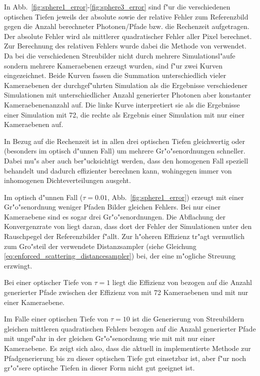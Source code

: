 	
	In Abb.~\ref{fig:sphere1_error}-\ref{fig:sphere3_error} sind f"ur die verschiedenen optischen Tiefen jeweils der absolute sowie der relative Fehler zum Referenzbild gegen die Anzahl berechneter Photonen/Pfade bzw. die Rechenzeit aufgetragen. Der absolute Fehler wird als mittlerer quadratischer Fehler aller Pixel berechnet. Zur Berechnung des relativen Fehlers wurde dabei die Methode von \citet{Pryce:1984p13059} verwendet. Da bei \mctd die verschiedenen Streubilder nicht durch mehrere Simulationsl"aufe sondern mehrere Kameraebenen erzeugt wurden, sind f"ur \mctd zwei Kurven eingezeichnet. Beide Kurven fassen die Summation unterschiedlich vieler Kameraebenen der durchgef"uhrten Simulation als die Ergebnisse verschiedener Simulationen mit unterschiedlicher Anzahl generierter Photonen aber konstanter Kameraebenenanzahl auf. Die linke Kurve interpretiert sie als die Ergebnisse einer Simulation mit 72, die rechte als Ergebnis einer Simulation mit nur einer Kameraebenen auf.
	
	In Bezug auf die Rechenzeit ist \pirate in allen drei optischen Tiefen gleichwertig oder (besonders im optisch d"unnen Fall) um mehrere Gr"o"senordnungen schneller. Dabei mu"s aber auch ber"ucksichtigt werden, dass \pirate den homogenen Fall speziell behandelt und dadurch effizienter berechnen kann, wohingegen \mctd immer von inhomogenen Dichteverteilungen ausgeht.
	
	Im optisch d"unnen Fall ($\tau=0.01$, Abb.~\ref{fig:sphere1_error}) erzeugt \pirate mit einer Gr"o"senordnung weniger Pfaden Bilder gleichen Fehlers. Bei nur einer Kameraebene sind es sogar drei Gr"o"senordnungen. Die Abflachung der Konvergenzrate von \pirate liegt daran, dass dort der Fehler der Simulationen unter den Rauschpegel der Referenzbilder f"allt. Zur h"oheren Effizienz tr"agt vermutlich zum Gro"steil der verwendete Distanzsampler (siehe Gleichung \ref{eq:enforced_scattering_distancesampler}) bei, der eine m"ogliche Streuung erzwingt.
	
	Bei einer optischer Tiefe von $\tau=1$ liegt die Effizienz von \pirate bezogen auf die Anzahl generierter Pfade zwischen der Effizienz von \mctd mit 72 Kameraebenen und \mctd mit nur einer Kameraebene.
	
	Im Falle einer optischen Tiefe von $\tau=10$ ist die Generierung von Streubildern gleichen mittleren quadratischen Fehlers bezogen auf die Anzahl generierter Pfade mit \pirate ungef"ahr in der gleichen Gr"o"senordnung wie mit \mctd mit nur einer Kameraebene. Es zeigt sich also, dass die aktuell in \pirate implementierte Methode zur Pfadgenerierung bis zu dieser optischen Tiefe gut einsetzbar ist, aber f"ur noch gr"o"sere optische Tiefen in dieser Form nicht gut geeignet ist.

